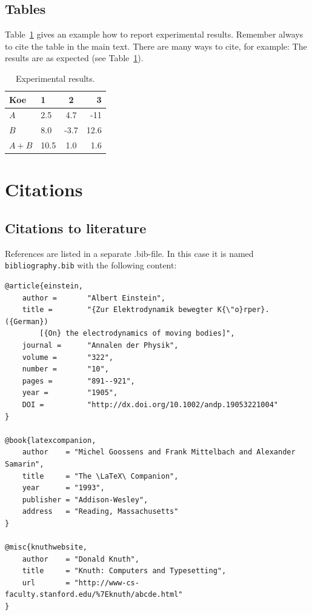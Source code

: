 \documentclass[english,twoside,openright]{UH_DS_MSc}
\begin{document}
\section{Tables}

Table~\ref{table:results} gives an example how to report experimental results. Remember always to cite the table in the main text. There are many ways to cite, for example: The results are as expected (see Table~\ref{table:results}).

\begin{table}
\centering
\caption{Experimental results.\label{table:results}}
\begin{tabular}{l||l c r} 
Koe & 1 & 2 & 3 \\ 
\hline \hline 
$A$ & 2.5 & 4.7 & -11 \\
$B$ & 8.0 & -3.7 & 12.6 \\
$A+B$ & 10.5 & 1.0 & 1.6 \\
\hline
%
\end{tabular}
\end{table}

\chapter{Citations}

\section{Citations to literature}

References are listed in a separate .bib-file. In this case it is named \texttt{bibliography.bib} with the following content:
\begin{verbatim}
@article{einstein,
    author =       "Albert Einstein",
    title =        "{Zur Elektrodynamik bewegter K{\"o}rper}. ({German})
        [{On} the electrodynamics of moving bodies]",
    journal =      "Annalen der Physik",
    volume =       "322",
    number =       "10",
    pages =        "891--921",
    year =         "1905",
    DOI =          "http://dx.doi.org/10.1002/andp.19053221004"
}
 
@book{latexcompanion,
    author    = "Michel Goossens and Frank Mittelbach and Alexander Samarin",
    title     = "The \LaTeX\ Companion",
    year      = "1993",
    publisher = "Addison-Wesley",
    address   = "Reading, Massachusetts"
}
 
@misc{knuthwebsite,
    author    = "Donald Knuth",
    title     = "Knuth: Computers and Typesetting",
    url       = "http://www-cs-faculty.stanford.edu/%7Eknuth/abcde.html"
}
\end{verbatim}
\end{document}
